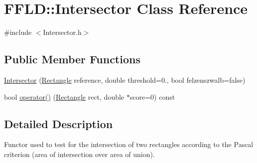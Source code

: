 \hypertarget{class_f_f_l_d_1_1_intersector}{\section{F\-F\-L\-D\-:\-:Intersector Class Reference}
\label{class_f_f_l_d_1_1_intersector}
}


{\ttfamily \#include $<$Intersector.\-h$>$}

\subsection*{Public Member Functions}
\begin{DoxyCompactItemize}
\item 
\hyperlink{class_f_f_l_d_1_1_intersector_aed95bdbcf7b5f24b1dd5b797bcc127fd}{Intersector} (\hyperlink{class_f_f_l_d_1_1_rectangle}{Rectangle} reference, double threshold=0., bool felzenszwalb=false)
\item 
bool \hyperlink{class_f_f_l_d_1_1_intersector_a2ba78e41d3bf04a2ced101d56ad47d85}{operator()} (\hyperlink{class_f_f_l_d_1_1_rectangle}{Rectangle} rect, double $\ast$score=0) const 
\end{DoxyCompactItemize}


\subsection{Detailed Description}
Functor used to test for the intersection of two rectangles according to the Pascal criterion (area of intersection over area of union). 

